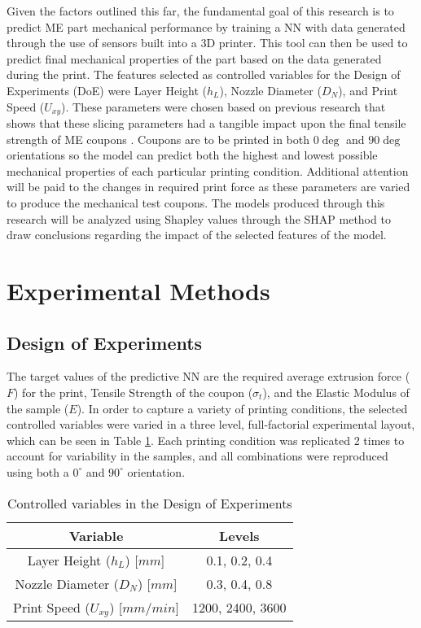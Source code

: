 \documentclass[main.tex]{subfiles}
\begin{document}
Given the factors outlined this far, the fundamental goal of this research is to predict ME part mechanical performance by training a NN with data generated through the use of sensors built into a 3D printer. This tool can then be used to predict final mechanical properties of the part based on the data generated during the print. The features selected as controlled variables for the Design of Experiments (DoE) were Layer Height ($h_{L}$), Nozzle Diameter ($D_{N}$), and Print Speed ($U_{xy}$). These parameters were chosen based on previous research that shows that these slicing parameters had a tangible impact upon the final tensile strength of ME coupons \cite{Koch2017, Rankouhi2016}. Coupons are to be printed in both $0\deg$ and $90\deg$ orientations so the model can predict both the highest and lowest possible mechanical properties of each particular printing condition. Additional attention will be paid to the changes in required print force as these parameters are varied to produce the mechanical test coupons. The models produced through this research will be analyzed using Shapley values through the SHAP method to draw conclusions regarding the impact of the selected features of the model.

\section{Experimental Methods} \label{sec:ml_meth}

\subsection{Design of Experiments}\label{ssec:doe}

The target values of the predictive NN are the required average extrusion force ($F$) for the print, Tensile Strength of the coupon ($\sigma_{t}$), and the Elastic Modulus of the sample ($E$). In order to capture a variety of printing conditions, the selected controlled variables were varied in a three level, full-factorial experimental layout, which can be seen in Table \ref{tab:ml_doe}. Each printing condition was replicated 2 times to account for variability in the samples, and all combinations were reproduced using both a $0^{\circ}$ and $90^{\circ}$ orientation.

\begin{table}[!htbp] %
	\renewcommand{\arraystretch}{1.5}
	\centering
	\caption{Controlled variables in the Design of Experiments}
	\begin{tabular}{ c c } 
		\toprule
		\textbf{Variable} & \textbf{Levels} \\
		\midrule
		 Layer Height ($h_{L}$) [$mm$]  &  0.1, 0.2, 0.4\\
		 Nozzle Diameter ($D_{N}$) [$mm$] & 0.3, 0.4, 0.8\\
		 Print Speed ($U_{xy}$) [$mm/min$] & 1200, 2400, 3600\\
		\bottomrule
	\end{tabular}
	\label{tab:ml_doe}
\end{table}
\end{document}
